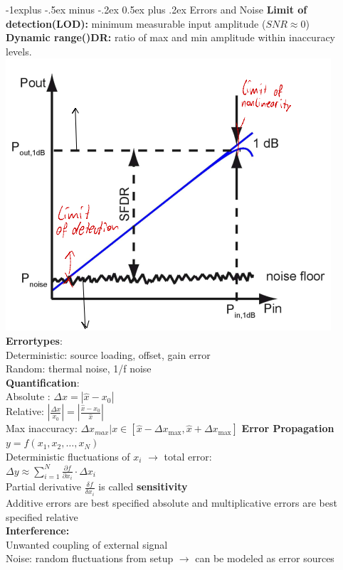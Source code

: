 \documentclass[5pt,landscape]{article}
\makeatletter
\renewcommand{\subsection}{\@startsection{subsection}{2}{0mm}%
                                {-1explus -.5ex minus -.2ex}%
                                {0.5ex plus .2ex}%
                                {\normalfont\normalsize\bfseries}}
\makeatother
\begin{document}
\begin{multicols*}{5}
 \subsection{Errors and Noise}
 \textbf{Limit of detection(LOD):} minimum measurable input amplitude ($ SNR \approx 0 $)  \\
 \textbf{Dynamic range()DR:} ratio of max and min amplitude within inaccuracy levels.\\
 \includegraphics[width = \columnwidth]{images/lod_dr.png}\\
 \textbf{Errortypes}:\\
 Deterministic: source loading, offset, gain error \\
 Random: thermal noise, 1/f noise\\
 \textbf{Quantification}:\\
 Absolute : $ \Delta x=\left|\hat{x}-x_{0}\right| $\\
Relative: $\left|\frac{\Delta x}{x_{0}}\right|=\left|\frac{\hat{x}-x_{0}}{\hat{x}}\right|  $\\
Max inaccuracy: $ \Delta x_{max}| x \in \left[\hat{x}-\Delta x_{\max }, \hat{x}+\Delta x_{\max }\right] $
\textbf{Error Propagation}\\
$ y=f\left(x_{1}, x_{2}, \ldots, x_{N}\right) $\\
Deterministic fluctuations of $ x_i $ $ \rightarrow $ total error:\\
$\Delta y \approx \sum_{i=1}^{N} \frac{\partial f}{\partial x_{i}} \cdot \Delta x_{i}  $\\
Partial derivative $ \frac{\delta f}{\delta x_i} $ is called \textbf{sensitivity}\\
Additive errors are best specified absolute and multiplicative errors are best specified relative \\
\textbf{Interference:}\\
Unwanted coupling of external signal\\
Noise: random fluctuations from setup $ \rightarrow $ can be modeled as error sources

\end{multicols*}
\end{document}
